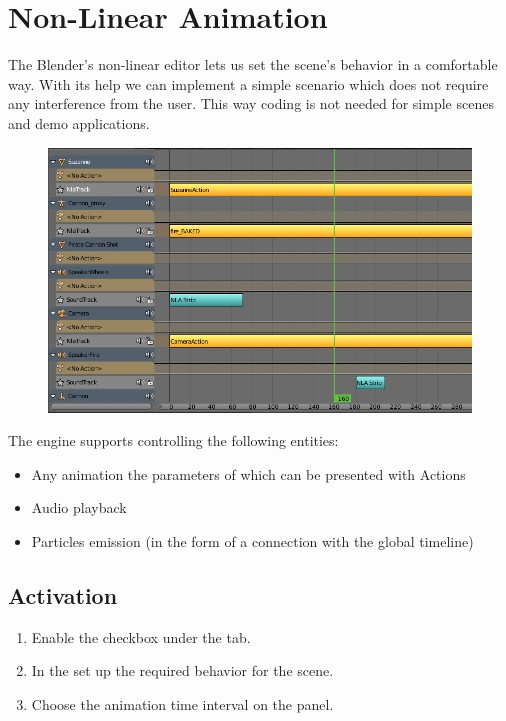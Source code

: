 \documentclass[a4paper,12pt,oneside]{sphinxmanual}
\begin{document}
\chapter{Non-Linear Animation}
\label{nla:nla}\label{nla::doc}\label{nla:id1}
The Blender's non-linear editor lets us set the scene's behavior in a comfortable way. With its help we can implement a simple scenario which does not require any interference from the user. This way coding is not needed for simple scenes and demo applications.
\begin{figure}[htbp]
\centering

\includegraphics{nla_editor.jpg}
\end{figure}

The engine supports controlling the following entities:
\begin{itemize}
\item {} 
Any animation the parameters of which can be presented with Actions

\item {} 
Audio playback

\item {} 
Particles emission (in the form of a connection with the global timeline)

\end{itemize}


\section{Activation}
\label{nla:id2}\begin{enumerate}
\item {} 
Enable the  checkbox under the  tab.

\item {} 
In the  set up the required behavior for the scene.

\item {} 
Choose the animation time interval on the  panel.

\end{enumerate}
\end{document}
